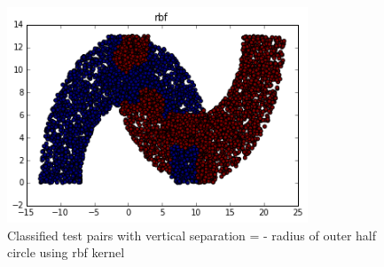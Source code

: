 \documentclass[paper=a4, fontsize=11pt]{scrartcl} %
\numberwithin{equation}{section} %
\numberwithin{figure}{section} %
\numberwithin{table}{section} %
\begin{document}
\begin{figure}[H]
	\centering
  \includegraphics[width=0.8\textwidth]{rbf_4.png}
	\caption{Classified test pairs with vertical separation = - radius of outer half circle using rbf kernel}
	\label{fig_rbf4}
\end{figure}
\end{document}
